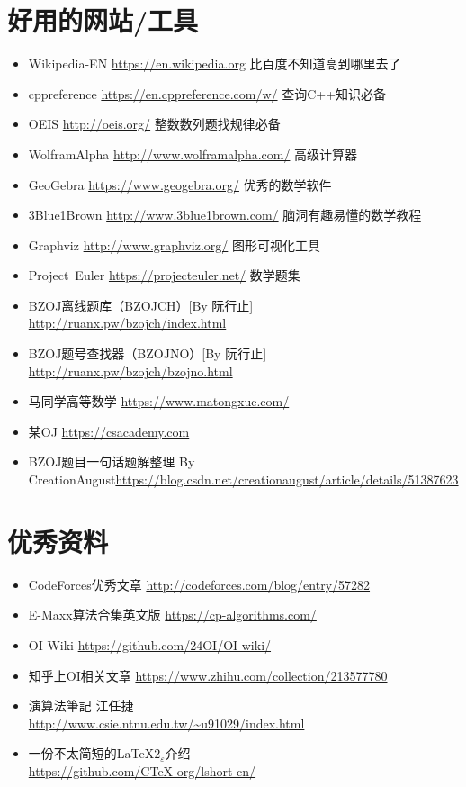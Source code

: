 \section{好用的网站/工具}
\begin{itemize}
    \item Wikipedia-EN \url{https://en.wikipedia.org} 比百度不知道高到哪里去了
    \item cppreference \url{https://en.cppreference.com/w/} 查询C++知识必备
    \item OEIS \url{http://oeis.org/} 整数数列题找规律必备
    \item WolframAlpha \url{http://www.wolframalpha.com/} 高级计算器
    \item GeoGebra \url{https://www.geogebra.org/} 优秀的数学软件
    \item 3Blue1Brown \url{http://www.3blue1brown.com/} 脑洞有趣易懂的数学教程
    \item Graphviz \url{http://www.graphviz.org/} 图形可视化工具
    \item Project~Euler \url{https://projecteuler.net/} 数学题集
    \item BZOJ离线题库（BZOJCH）[By 阮行止] \\\url{http://ruanx.pw/bzojch/index.html}
    \item BZOJ题号查找器（BZOJNO）[By 阮行止]
    \url{http://ruanx.pw/bzojch/bzojno.html}
    \item 马同学高等数学 \url{https://www.matongxue.com/}
    \item 某OJ \url{https://csacademy.com}
    \item BZOJ题目一句话题解整理 By CreationAugust\url{https://blog.csdn.net/creationaugust/article/details/51387623}
\end{itemize}
\section{优秀资料}
\begin{itemize}
    \item CodeForces优秀文章 \url{http://codeforces.com/blog/entry/57282}
    \item E-Maxx算法合集英文版 \url{https://cp-algorithms.com/}
    \item OI-Wiki \url{https://github.com/24OI/OI-wiki/}
    \item 知乎上OI相关文章 \url{https://www.zhihu.com/collection/213577780}
    \item 演算法筆記 江任捷\\\url{http://www.csie.ntnu.edu.tw/\~u91029/index.html}
    \item 一份不太简短的\LaTeX{}$2_{\varepsilon}$介绍\\
    \url{https://github.com/CTeX-org/lshort-cn/}
\end{itemize}
